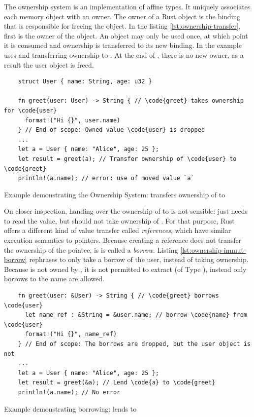 \documentclass[twoside, english]{sdqthesis}
\theoremstyle{definition}
\begin{document}
The ownership system is an implementation of affine types. It uniquely associates each memory object with an owner. 
The owner of a Rust object is the binding that is responsible for freeing the object. In the listing \ref{lst:ownership-transfer}, first  is the owner of the  object. An object may only be used once, at which point it is consumed and ownership is transferred to its new binding. In the example  uses  and transferring ownership to . At the end of , there is no new owner, as a result the user object is freed.

\begin{listing}[h]
  \begin{verbatim}
    struct User { name: String, age: u32 }

    fn greet(user: User) -> String { // \code{greet} takes ownership for \code{user}
      format!("Hi {}", user.name)
    } // End of scope: Owned value \code{user} is dropped
    ...
    let a = User { name: "Alice", age: 25 };
    let result = greet(a); // Transfer ownership of \code{user} to \code{greet}
    println!(a.name); // error: use of moved value `a`
  \end{verbatim}
  \caption{Example demonstrating the Ownership System:  transfers ownership of  to }
  \label{lst:ownership-transfer}
\end{listing}

On closer inspection, handing over the ownership of  to  is not sensible:  just needs to read the value, but should not take ownership of . 
For that purpose, Rust offers a different kind of value transfer called \textit{references}, which have similar execution semantics to pointers. Because creating a reference does not transfer the ownership of the pointee, is is called a \textit{borrow}. Listing \ref{lst:ownership-immut-borrow} rephrases  to only take a borrow of the user, instead of taking ownership. Because  is not owned by , it is not permitted to extract  (of Type ), instead only borrows to the name are allowed. 

\begin{listing}[h]
  \begin{verbatim}
    fn greet(user: &User) -> String { // \code{greet} borrows \code{user}
      let name_ref : &String = &user.name; // borrow \code{name} from \code{user}
      format!("Hi {}", name_ref)
    } // End of scope: The borrows are dropped, but the user object is not
    ...
    let a = User { name: "Alice", age: 25 };
    let result = greet(&a); // Lend \code{a} to \code{greet}
    println!(a.name); // No error
  \end{verbatim}
  \caption{Example demonstrating borrowing:  lends  to }
  \label{lst:ownership-immut-borrow}
\end{listing}
\end{document}
